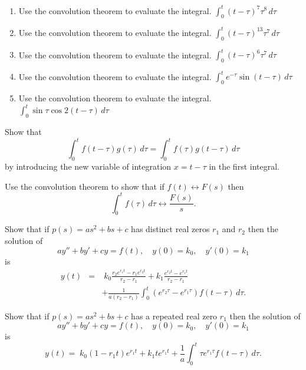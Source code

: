 \documentclass{ximera}
\begin{document}
\begin{problem}\label{exer:8.6.5}

\begin{enumerate}

\item Use the convolution theorem to evaluate the integral.
$\int_0^t (t-\tau)^7\tau^8\,
d\tau$

\item Use the convolution theorem to evaluate the integral.
$\int_0^t(t-\tau)^{13}\tau^7\,d\tau$

\item Use the convolution theorem to evaluate the integral.
$\int_0^t(t-\tau)^6\tau^7\,
d\tau$

\item Use the convolution theorem to evaluate the integral.
$\int_0^te^{-\tau}\sin(t-\tau)\,d\tau$

\item Use the convolution theorem to evaluate the integral.
 $\int_0^t\sin\tau\cos2(t-\tau)\,d\tau$
\end{enumerate}
\end{problem}

\begin{problem}\label{exer:8.6.6}
 Show that
$$
\int_0^tf(t-\tau)g(\tau)\,d\tau=\int_0^tf(\tau)g(t-\tau)\,d\tau
$$
by introducing the new variable of integration $x=t-\tau$ in the first
integral.
\end{problem}

\begin{problem}\label{exer:8.6.7} Use the convolution theorem to show that if
$f(t)\leftrightarrow F(s)$ then
$$
\int_0^tf(\tau)\,d\tau\leftrightarrow \frac{F(s)}{s}.
$$
\end{problem}

\begin{problem}\label{exer:8.6.8}
 Show that if $p(s)=as^2+bs+c$ has
distinct real zeros $r_1$ and $r_2$ then the solution of
$$
ay''+by'+cy=f(t),\quad y(0)=k_0,\quad y'(0)=k_1
$$
is
\begin{eqnarray*}
y(t)&=&\; k_0\frac{r_2e^{r_1t}-r_1e^{r_2t}}{r_2-r_1}+k_1\frac{e^{r_2t}-e^{r_1t}
}{r_2-r_1}
\\
&&+\frac{1}{a(r_2-r_1)}\int_0^t(e^{r_2\tau}-e^{r_1\tau})f(t-\tau)\,d\tau.
\end{eqnarray*}
\end{problem}

\begin{problem}\label{exer:8.6.9}
Show that if $p(s)=as^2+bs+c$ has
a repeated  real zero $r_1$ then
 the solution of
$$
ay''+by'+cy=f(t),\quad y(0)=k_0,\quad y'(0)=k_1
$$
is
$$
y(t)=\; k_0(1-r_1t)e^{r_1t}+k_1te^{r_1t}
+\frac{1}{a}\int_0^t\tau
e^{r_1\tau}f(t-\tau)\,d\tau.
$$
\end{problem}
\end{document}
